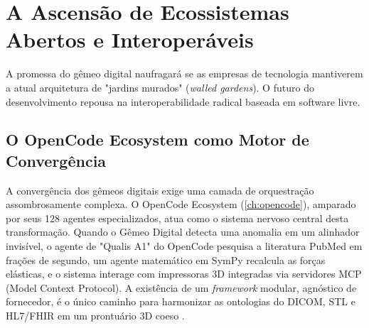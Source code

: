 \section{A Ascensão de Ecossistemas Abertos e Interoperáveis}

A promessa do gêmeo digital naufragará se as empresas de tecnologia mantiverem a atual arquitetura de "jardins murados" (\textit{walled gardens}). O futuro do desenvolvimento repousa na interoperabilidade radical baseada em software livre.

\subsection{O OpenCode Ecosystem como Motor de Convergência}

A convergência dos gêmeos digitais exige uma camada de orquestração assombrosamente complexa. O OpenCode Ecosystem (\autoref{ch:opencode}), amparado por seus 128 agentes especializados, atua como o sistema nervoso central desta transformação. Quando o Gêmeo Digital detecta uma anomalia em um alinhador invisível, o agente de "Qualis A1" do OpenCode pesquisa a literatura PubMed em frações de segundo, um agente matemático em SymPy recalcula as forças elásticas, e o sistema interage com impressoras 3D integradas via servidores MCP (Model Context Protocol). A existência de um \textit{framework} modular, agnóstico de fornecedor, é o único caminho para harmonizar as ontologias do DICOM, STL e HL7/FHIR em um prontuário 3D coeso \cite{robles2023opentwins}.

